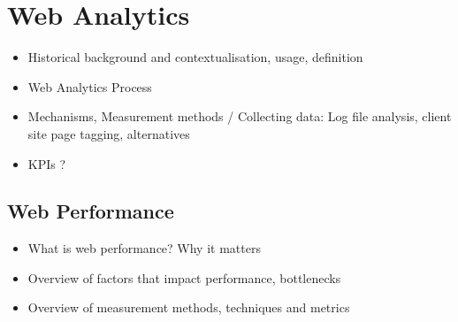 







\section{Web Analytics}

\begin{itemize}
\item Historical background and contextualisation, usage, definition
\item Web Analytics Process
\item Mechanisms, Measurement methods / Collecting data: Log file analysis, client site page tagging, alternatives
\item KPIs ?
\end{itemize}

















\subsection{Web Performance}

\begin{itemize}
\item What is web performance? Why it matters
\item Overview of factors that impact performance, bottlenecks
\item Overview of measurement methods, techniques and metrics
\end{itemize}



